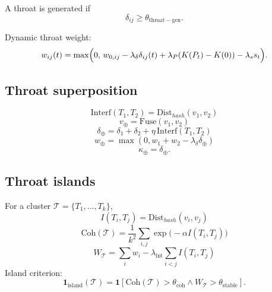 \documentclass[11pt,a4paper]{article}
\begin{document}
A throat is generated if
\begin{equation}
\delta_{ij}\ge \theta_{\mathrm{throat-gen}}.
\label{eq:throat_gen}
\end{equation}

Dynamic throat weight:
\begin{equation}
w_{ij}(t)=
\max\Bigl(
0,\,
w_{0,ij}
-\lambda_\delta \delta_{ij}(t)
+\lambda_P(K(P_t)-K(0))
-\lambda_s s_t
\Bigr).
\label{eq:throat_weight}
\end{equation}

\subsection{Throat superposition}

\begin{equation}
\mathrm{Interf}(T_1,T_2)=\mathrm{Dist}_{hash}(v_1,v_2)
\label{eq:interference}
\end{equation}
\begin{equation}
v_\oplus=\mathrm{Fuse}(v_1,v_2)
\label{eq:fused_vec}
\end{equation}
\begin{equation}
\delta_\oplus=\delta_1+\delta_2+\eta\,\mathrm{Interf}(T_1,T_2)
\label{eq:superposed_mismatch}
\end{equation}
\begin{equation}
w_\oplus=\max(0,w_1+w_2-\lambda_\delta\delta_\oplus)
\label{eq:superposed_weight}
\end{equation}
\begin{equation}
\kappa_\oplus=\delta_\oplus.
\label{eq:superposed_curvature}
\end{equation}

\subsection{Throat islands}

For a cluster $\mathcal{T}=\{T_1,\dots,T_k\}$,
\begin{equation}
I(T_i,T_j)=\mathrm{Dist}_{hash}(v_i,v_j)
\label{eq:pairwise_interference}
\end{equation}
\begin{equation}
\mathrm{Coh}(\mathcal{T})=
\frac{1}{k^2}\sum_{i,j}\exp\bigl(-\alpha I(T_i,T_j)\bigr)
\label{eq:island_coherence}
\end{equation}
\begin{equation}
W_{\mathcal{T}}=
\sum_i w_i-\lambda_{\mathrm{int}}\sum_{i<j}I(T_i,T_j)
\label{eq:island_weight}
\end{equation}
Island criterion:
\begin{equation}
\mathbf{1}_{\mathrm{island}}(\mathcal{T})=
\mathbf{1}\left[
\mathrm{Coh}(\mathcal{T})>\theta_{\mathrm{coh}}
\land
W_{\mathcal{T}}>\theta_{\mathrm{stable}}
\right].
\label{eq:island_indicator}
\end{equation}
\end{document}
